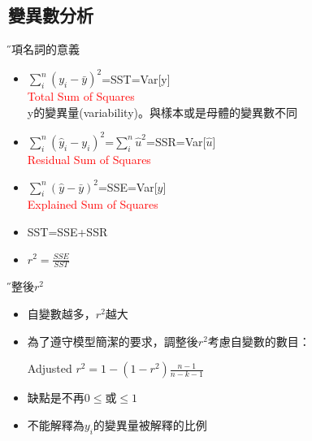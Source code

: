 \documentclass[xcolor=dvipsnames]{beamer}
\begin{document}
\subsection{變異數分析}
\begin{frame}{\H 各項名詞的意義}
\begin{itemize}
\item $\sum _{i}^n(y_{i}-\bar{y})^2$=SST=Var[y]\\
{\textcolor{red}{Total Sum of Squares}}\\
y的變異量(variability)。與樣本或是母體的變異數不同
\medskip
\item $\sum _{i}^n(\hat{y}_{i}-y_{i})^2$=$\sum _{i}^n\hat{u}^2$=SSR=Var[$\hat{u}$]\\
{\textcolor{red}{Residual Sum of Squares}}\\
\medskip
\item $\sum _{i}^n(\hat{y}-\bar{y})^2$=SSE=Var[$\hat{y}$]\\
{\textcolor{red}{Explained Sum of Squares}}\\
\medskip
\item SST=SSE+SSR
\item $r^2=\frac{SSE}{SST}$
\end{itemize}
\end{frame}
\begin{frame}{\H 調整後$r^2$}
\begin{itemize}
\item 自變數越多，$r^2$越大
\item 為了遵守模型簡潔的要求，調整後$r^2$考慮自變數的數目：
\begin{center}
Adjusted $r^2=1-(1-r^2)\frac{n-1}{n-k-1}$
\end{center}
\item 缺點是不再$0\leq $或$\leq 1$
\item 不能解釋為$y_{i}$的變異量被解釋的比例
\end{itemize}
\end{frame}
\end{document}
